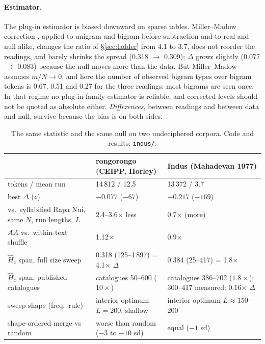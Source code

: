 \documentclass[11pt,a4paper]{article}
\newcommand{\Hcn}{\hat H_{\mathrm{c}}}
\begin{document}
\paragraph{Estimator.} The plug-in estimator is biased downward on sparse tables. Miller--Madow correction \citep{miller1955}, applied to unigram and bigram before subtraction and to real and null alike, changes the ratio of \S\ref{sec:ladder} from 4.1 to 3.7, does not reorder the readings, and barely shrinks the spread (0.318 $\to$ 0.309); $\Delta$ grows slightly (0.077 $\to$ 0.083) because the null moves more than the data. But Miller--Madow assumes $m/N \to 0$, and here the number of observed bigram types over bigram tokens is 0.67, 0.51 and 0.27 for the three readings: most bigrams are seen once. In that regime no plug-in-family estimator is reliable, and corrected levels should not be quoted as absolute either. \emph{Differences}, between readings and between data and null, survive because the bias is on both sides.

\begin{table}[t]
\centering\footnotesize
\begin{tabular}{@{}p{4.3cm}p{4.9cm}p{4.9cm}@{}}
\toprule
 & rongorongo (CEIPP, Horley) & Indus (Mahadevan 1977) \\
\midrule
tokens / mean run & 14\,812 / 12.5 & 13\,372 / 3.7 \\
best $\Delta$ ($z$) & $-0.077$ ($-67$) & $-0.217$ ($-169$) \\
vs.\ syllabified Rapa Nui, same $N$, run lengths, $L$ & 2.4--3.6$\times$ less & 0.7$\times$ (more) \\
$AA$ vs.\ within-text shuffle & 1.12$\times$ & 0.9$\times$ \\
$\Hcn$ span, full size sweep & 0.318 (125--1\,897) = 4.1$\times$ $\Delta$ & 0.384 (25--417) = 1.8$\times$ \\
$\Hcn$ span, published catalogues & catalogues 50--600 ($10\times$) & catalogues 386--702 ($1.8\times$); 300--417 measured: 0.16$\times$ $\Delta$ \\
sweep shape (freq.\ rule) & interior optimum $L=200$, shallow & interior optimum $L\approx150$--$200$ \\
shape-ordered merge vs random & worse than random ($-3$ to $-10$ sd) & equal ($-1$ sd) \\
\bottomrule
\end{tabular}
\caption{The same statistic and the same null on two undeciphered corpora. Code and results: \texttt{indus/}.}
\label{tab:indus}
\end{table}
\end{document}
